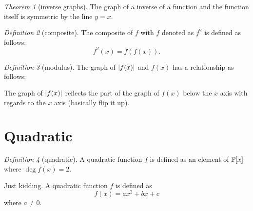 \documentclass[8pt]{article}
\theoremstyle{remark}
\newtheorem{theorem}{Theorem}[section]
\newtheorem{definition}[theorem]{Definition}
\begin{document}
        \begin{theorem}[inverse graphs]
            The graph of a inverse of a function and the function itself is symmetric by the line $y = x$.
        \end{theorem}

        \begin{definition}[composite]
            The composite of $f$ with $f$ denoted as $f^2$ is defined as follows:
            $$
            f^2(x) = f(f(x)).
            $$
        \end{definition}

        \begin{definition}[modulus]
            The graph of $\left\lvert f(x) \right\rvert$ and $f(x)$ has a relationship as follows:

            The graph of $\left\lvert f(x) \right\rvert$ reflects the part of the graph of $f(x)$ below the $x$ axis with regards to the $x$ axis (basically flip it up).
        \end{definition}

    \section{Quadratic}
        \begin{definition}[quadratic]
            A quadratic function $f$ is defined as an element of $\mathbb{P}[x]$ where $\deg f(x) = 2$.

            Just kidding. A quadratic function $f$ is defined as
            $$
            f(x) = ax^2 + bx + c
            $$
            where $a \neq 0$.
        \end{definition}
\end{document}
